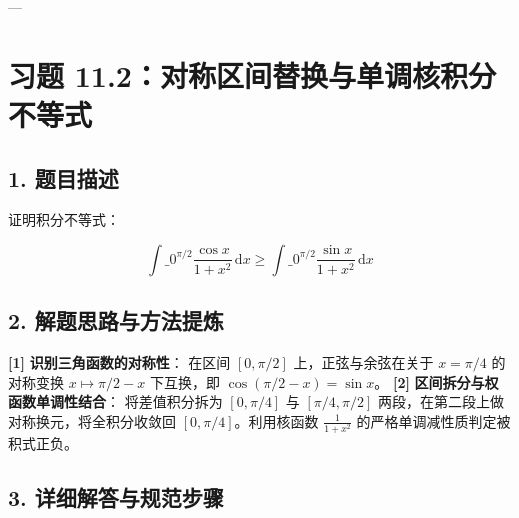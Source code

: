 \documentclass[11pt,a4paper,UTF8]{ctexart}
\begin{document}
---


\section{习题 11.2：对称区间替换与单调核积分不等式}


\subsection{1. 题目描述}
证明积分不等式：

\begin{equation*}
\int\_0^{\pi/2} \frac{\cos x}{1+x^2}\,\mathrm{d}x \ge \int\_0^{\pi/2} \frac{\sin x}{1+x^2}\,\mathrm{d}x
\end{equation*}



\subsection{2. 解题思路与方法提炼}
\begin{solbox}[分步推导与答题规范]
\textbf{[1]}  \textbf{识别三角函数的对称性}：
在区间 $[0, \pi/2]$ 上，正弦与余弦在关于 $x = \pi/4$ 的对称变换 $x \mapsto \pi/2 - x$ 下互换，即 $\cos(\pi/2 - x) = \sin x$。
\textbf{[2]}  \textbf{区间拆分与权函数单调性结合}：
将差值积分拆为 $[0, \pi/4]$ 与 $[\pi/4, \pi/2]$ 两段，在第二段上做对称换元，将全积分收敛回 $[0, \pi/4]$。利用核函数 $\frac{1}{1+x^2}$ 的严格单调减性质判定被积式正负。
\end{solbox}


\subsection{3. 详细解答与规范步骤}
\end{document}
